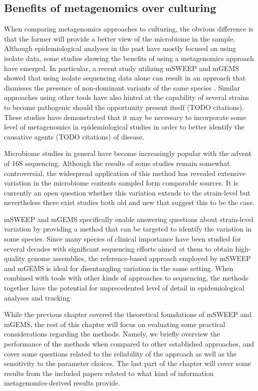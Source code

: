\documentclass[officiallayout]{tktla}
\begin{document}
\subsection{Benefits of metagenomics over culturing}

When comparing metagenomics approaches to culturing, the obvious
difference is that the former will provide a better view of the
microbiome in the sample. Although epidemiological analyses in the
past have mostly focused on using isolate data, some studies showing
the benefits of using a metagenomics approach have emerged. In
particular, a recent study utilizing mSWEEP and mGEMS showed that
using isolate sequencing data alone can result in an approach that
dismisses the presence of non-dominant variants of the same species
\citep{tonkin-hill_pneumococcal_2022}. Similar approaches using other
tools have also hinted at the capability of several strains to become
pathogenic should the opportunity present itself (TODO
citations). These studies have demonstrated that it may be necessary
to incorporate some level of metagenomics in epidemiological studies
in order to better identify the causative agents (TODO citations) of
disease.

Microbiome studies in general have become increasingly popular with
the advent of 16S sequencing. Although the results of some studies
remain somewhat controversial, the widespread application of this
method has revealed extensive variation in the microbiome contents
sampled form comparable sources. It is currently an open question
whether this variation extends to the strain-level but nevertheless
there exist studies both old and new that suggest this to be the
case.

mSWEEP and mGEMS specifically enable answering questions about
strain-level variation by providing a method that can be targeted to
identify the variation in some species. Since many species of clinical
importance have been studied for several decades with significant
sequencing efforts aimed at them to obtain high-quality genome
assemblies, the reference-based approach employed by mSWEEP and mGEMS
is ideal for disentangling variation in the same setting. When
combined with tools with other kinds of approaches to sequencing, the
methods together have the potential for unprecedented level of detail
in epidemiological analyses and tracking

While the previous chapter covered the theoretical foundations of
mSWEEP and mGEMS, the rest of this chapter will focus on evaluating
some practical considerations regarding the methods. Namely, we
briefly overview the performance of the methods when compared to other
established approaches, and cover some questions related to the
reliability of the approach as well as the sensitivity to the
parameter choices. The last part of the chapter will cover some
results from the included papers related to what kind of information
metagenomics-derived results provide.
\end{document}
